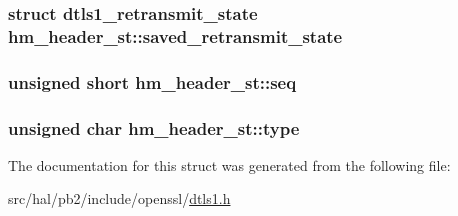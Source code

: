 \subsubsection[{\texorpdfstring{saved\+\_\+retransmit\+\_\+state}{saved_retransmit_state}}]{\setlength{\rightskip}{0pt plus 5cm}struct {\bf dtls1\+\_\+retransmit\+\_\+state} hm\+\_\+header\+\_\+st\+::saved\+\_\+retransmit\+\_\+state}\hypertarget{structhm__header__st_aa53c97a266f1246009cef42c434a6f22}{}\label{structhm__header__st_aa53c97a266f1246009cef42c434a6f22}
\subsubsection[{\texorpdfstring{seq}{seq}}]{\setlength{\rightskip}{0pt plus 5cm}unsigned short hm\+\_\+header\+\_\+st\+::seq}\hypertarget{structhm__header__st_a724a245fd7883a93da6cf4d701654889}{}\label{structhm__header__st_a724a245fd7883a93da6cf4d701654889}
\subsubsection[{\texorpdfstring{type}{type}}]{\setlength{\rightskip}{0pt plus 5cm}unsigned char hm\+\_\+header\+\_\+st\+::type}\hypertarget{structhm__header__st_afd990f37440d11253dd4d6f1cb5f227e}{}\label{structhm__header__st_afd990f37440d11253dd4d6f1cb5f227e}


The documentation for this struct was generated from the following file\+:\begin{DoxyCompactItemize}
\item 
src/hal/pb2/include/openssl/\hyperlink{dtls1_8h}{dtls1.\+h}\end{DoxyCompactItemize}

